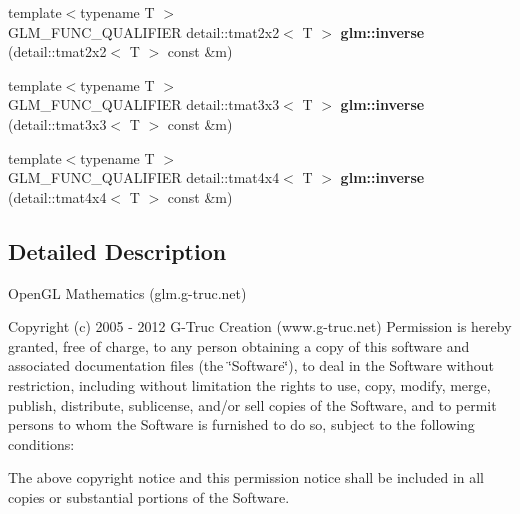 \begin{DoxyCompactItemize}
\item 
\hypertarget{namespaceglm_a0bdb22ae9f1447b6bfd92c704b638973}{{\footnotesize template$<$typename T $>$ }\\\-G\-L\-M\-\_\-\-F\-U\-N\-C\-\_\-\-Q\-U\-A\-L\-I\-F\-I\-E\-R \*
detail\-::tmat2x2$<$ \-T $>$ {\bfseries glm\-::inverse} (detail\-::tmat2x2$<$ \-T $>$ const \&m)}\label{namespaceglm_a0bdb22ae9f1447b6bfd92c704b638973}

\item 
\hypertarget{namespaceglm_aa36ca53440c855c7ff7671ab45768974}{{\footnotesize template$<$typename T $>$ }\\\-G\-L\-M\-\_\-\-F\-U\-N\-C\-\_\-\-Q\-U\-A\-L\-I\-F\-I\-E\-R \*
detail\-::tmat3x3$<$ \-T $>$ {\bfseries glm\-::inverse} (detail\-::tmat3x3$<$ \-T $>$ const \&m)}\label{namespaceglm_aa36ca53440c855c7ff7671ab45768974}

\item 
\hypertarget{namespaceglm_ac56acd990d10a871d52d3cf08b2e145f}{{\footnotesize template$<$typename T $>$ }\\\-G\-L\-M\-\_\-\-F\-U\-N\-C\-\_\-\-Q\-U\-A\-L\-I\-F\-I\-E\-R \*
detail\-::tmat4x4$<$ \-T $>$ {\bfseries glm\-::inverse} (detail\-::tmat4x4$<$ \-T $>$ const \&m)}\label{namespaceglm_ac56acd990d10a871d52d3cf08b2e145f}

\end{DoxyCompactItemize}


\subsection{\-Detailed \-Description}
\-Open\-G\-L \-Mathematics (glm.\-g-\/truc.\-net)

\-Copyright (c) 2005 -\/ 2012 \-G-\/\-Truc \-Creation (www.\-g-\/truc.\-net) \-Permission is hereby granted, free of charge, to any person obtaining a copy of this software and associated documentation files (the \char`\"{}\-Software\char`\"{}), to deal in the \-Software without restriction, including without limitation the rights to use, copy, modify, merge, publish, distribute, sublicense, and/or sell copies of the \-Software, and to permit persons to whom the \-Software is furnished to do so, subject to the following conditions\-:

\-The above copyright notice and this permission notice shall be included in all copies or substantial portions of the \-Software.

